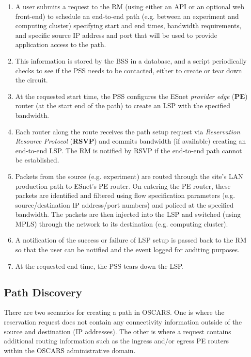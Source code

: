 \documentclass[conference]{IEEEtran}
\begin{document}
\begin{enumerate}
\item
A user submits a request to the RM (using either an API or
an optional web front-end) to schedule an end-to-end path (e.g. between an
experiment and computing cluster) specifying start and end times, bandwidth
requirements, and specific source IP address and port that will be used to     
provide application access to the path.

\item
This information is stored by the BSS in a database, and a script 
periodically checks to see if the PSS needs to be contacted, either to create 
or tear down the circuit.

\item
At the requested start time, the PSS configures the ESnet \emph{provider edge} (\textbf{PE}) router
(at the start end of the path) to create an LSP with the
specified bandwidth.

\item
Each router along the route receives the path setup request via \emph{Reservation Resource Protocol} (\textbf{RSVP})
and commits bandwidth (if available) creating an end-to-end LSP.  The RM is
notified by RSVP if the end-to-end path cannot be established.

\item
Packets from the source (e.g. experiment) are routed through the site's
LAN production path to ESnet's PE router.  On entering the PE router,
these packets are identified and filtered using flow specification parameters
(e.g. source/destination IP address/port numbers) and policed at the specified
bandwidth.  The packets are then injected into the LSP and switched (using MPLS)
through the network to its destination (e.g. computing cluster).

\item
A notification of the success or failure of LSP setup is 
passed back to the RM so that the user can be notified and the event 
logged for auditing purposes.

\item
At the requested end time, the PSS tears down the LSP.
\end{enumerate}

\subsection{Path Discovery}
There are two scenarios for creating a path in OSCARS.  One is where the
reservation request does not contain any connectivity information outside of
the source and destination (IP addresses).  The other is where a request
contains additional routing information such as the ingress and/or egress PE routers
within the OSCARS administrative domain.
\end{document}
